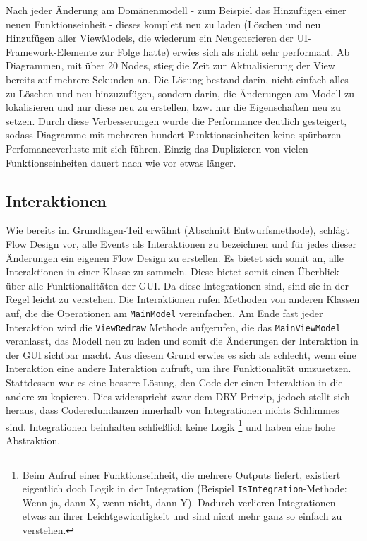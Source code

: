 Nach jeder Änderung am Domänenmodell - zum Beispiel das Hinzufügen einer neuen
Funktionseinheit -  dieses komplett neu zu laden (Löschen und neu Hinzufügen aller
ViewModels, die wiederum ein Neugenerieren der UI-Framework-Elemente zur
Folge hatte) erwies sich als nicht sehr performant. 
Ab Diagrammen, mit über 20 Nodes, stieg die Zeit zur Aktualisierung der View
bereits auf mehrere Sekunden an.
Die Lösung bestand darin, nicht einfach alles zu Löschen und neu
hinzuzufügen, sondern darin, die Änderungen am Modell zu lokalisieren und nur
diese neu zu erstellen, bzw. nur die Eigenschaften neu zu setzen. Durch
diese Verbesserungen wurde die Performance deutlich gesteigert, sodass
Diagramme mit mehreren hundert Funktionseinheiten keine spürbaren Perfomanceverluste mit
sich führen. Einzig das Duplizieren von vielen Funktionseinheiten dauert nach wie vor
etwas länger. 

\subsection{Interaktionen}

Wie bereits im Grundlagen-Teil erwähnt (Abschnitt Entwurfsmethode), schlägt Flow Design
vor, alle Events als Interaktionen zu bezeichnen und für jedes dieser
Änderungen ein eigenen Flow Design zu erstellen. 
Es bietet sich somit an, alle Interaktionen in einer Klasse zu sammeln.
Diese bietet somit einen Überblick über alle Funktionalitäten der GUI.
Da diese Integrationen sind, sind sie in der Regel leicht zu verstehen. Die
Interaktionen rufen Methoden von anderen Klassen auf, die die Operationen am
\texttt{MainModel} vereinfachen. Am Ende fast jeder Interaktion wird die \texttt{ViewRedraw} Methode aufgerufen, die das \texttt{MainViewModel} veranlasst, das Modell neu zu laden und somit die Änderungen der Interaktion in der GUI sichtbar macht.
Aus diesem Grund erwies es sich als schlecht, wenn eine Interaktion eine andere
Interaktion aufruft, um ihre Funktionalität umzusetzen. 
Stattdessen war es eine bessere Lösung, den Code der einen Interaktion in
die andere zu kopieren. Dies widerspricht zwar dem DRY Prinzip, jedoch stellt sich heraus, dass Coderedundanzen innerhalb von Integrationen nichts Schlimmes sind. Integrationen beinhalten schließlich keine Logik \footnote{Beim
Aufruf einer Funktionseinheit, die mehrere Outputs liefert, existiert
eigentlich doch Logik in der Integration (Beispiel \texttt{IsIntegration}-Methode: Wenn ja, dann X, wenn nicht, dann Y). Dadurch verlieren Integrationen etwas an ihrer
Leichtgewichtigkeit und sind nicht mehr ganz so einfach zu verstehen.} und haben eine hohe
Abstraktion.

